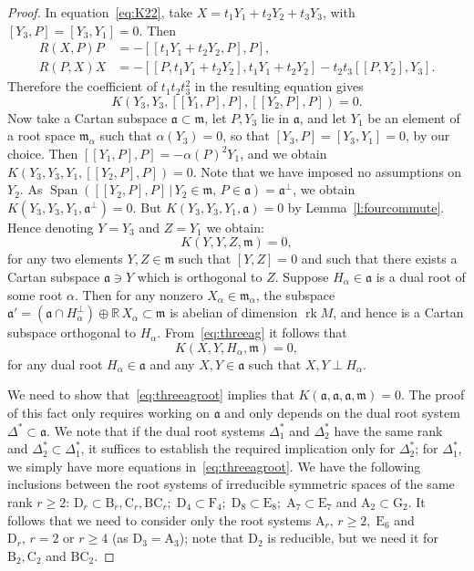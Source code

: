\documentclass[10pt,a4paper]{amsart}
\renewcommand \a{\alpha}
\newcommand \br{\mathbb{R}}
\newcommand \rk{\operatorname{rk}}
\newcommand \Span{\operatorname{Span}}
\newcommand\ag{\mathfrak a}
\newcommand\m{\mathfrak m}
\newcommand \<{\langle}
\renewcommand \>{\rangle}
\begin{document}
\begin{proof}
		In equation~\eqref{eq:K22}, take $X=t_1Y_1+t_2Y_2+t_3Y_3$, with $[Y_3,P] = [Y_3,Y_1]=0$. Then
		\[
		\begin{aligned}
			R(X,P)P &= -[[t_1Y_1+t_2Y_2,P],P],\\
			R(P,X)X &= -[[P,t_1Y_1+t_2Y_2],t_1Y_1+t_2Y_2]
			-t_2t_3[[P,Y_2],Y_3].
		\end{aligned}
		\]
		Therefore the coefficient of $t_1t_2t_3^2$ in the resulting equation gives
		\[
		K(Y_3,Y_3, [[Y_1,P],P], [[Y_2,P],P]) = 0.
		\]
		Now take a Cartan subspace $\ag \subset \m$, let $P, Y_3$ lie in $\ag$, and let $Y_1$ be an element of a root space $\m_\a$ such that $\a(Y_3) = 0$, so that $[Y_3,P] = [Y_3,Y_1]=0$, by our choice. Then $[[Y_1,P],P] = -\a(P)^2 Y_1$, and we obtain $K(Y_3,Y_3,Y_1, [[Y_2,P],P]) = 0$. Note that we have imposed no assumptions on $Y_2$. As $\Span([[Y_2,P],P] \, | \, Y_2 \in \m, \, P \in \ag) = \ag^\perp$, we obtain $K(Y_3,Y_3,Y_1, \ag^\perp) = 0$. But $K(Y_3,Y_3,Y_1, \ag) = 0$ by Lemma~\ref{l:fourcommute}. Hence denoting $Y=Y_3$ and $Z = Y_1$ we obtain:
		\begin{equation}\label{eq:threeag}
			K(Y,Y,Z,\m) = 0,
		\end{equation}
		for any two elements $Y,Z \in \m$ such that $[Y,Z] =0$ and such that there exists a Cartan subspace $\ag \ni Y$ which is orthogonal to $Z$. Suppose $H_\a \in \ag$ is a dual root of some root $\a$. Then for any nonzero $X_\a \in \m_\a$, the subspace $\ag' = (\ag \cap H_\a^\perp) \oplus \br \, X_\a \subset \m$ is abelian of dimension $\rk M$, and hence is a Cartan subspace orthogonal to $H_\a$. From~\eqref{eq:threeag} it follows that
		\begin{equation}\label{eq:threeagroot}
			K(X,Y,H_\a,\m) = 0,
		\end{equation}
for any dual root $H_\a \in \ag$ and any $X, Y \in \ag$ such that $X,Y \perp H_\a$.

We need to show that~\eqref{eq:threeagroot} implies that $K(\ag,\ag,\ag,\m) = 0$. The proof of this fact only requires working on $\ag$ and only depends on the dual root system $\Delta^* \subset \ag$. We note that if the dual root systems $\Delta^*_1$ and  $\Delta^*_2$ have the same rank and  $\Delta^*_2 \subset \Delta^*_1$, it suffices to establish the required implication only for  $\Delta^*_2$; for $\Delta^*_1$, we simply have more equations in~\eqref{eq:threeagroot}. We have the following inclusions between the root systems of irreducible symmetric spaces of the same rank $r \ge 2$: $\mathrm{D}_r \subset \mathrm{B}_r, \mathrm{C}_r, \mathrm{BC}_r; \; \mathrm{D}_4 \subset \mathrm{F}_4; \;  \mathrm{D}_8 \subset \mathrm{E}_8; \; \mathrm{A}_7 \subset \mathrm{E}_7$ and $\mathrm{A}_2 \subset \mathrm{G}_2$. It follows that we need to consider only the root systems $\mathrm{A}_r, \, r \ge 2, \; \mathrm{E}_6$ and $\mathrm{D}_r, \, r=2$ or $r \ge 4$ (as $\mathrm{D}_3 = \mathrm{A}_3$); note that $\mathrm{D}_2$ is reducible, but we need it for $\mathrm{B}_2, \mathrm{C}_2$ and $\mathrm{BC}_2$.


\end{proof}
\end{document}
